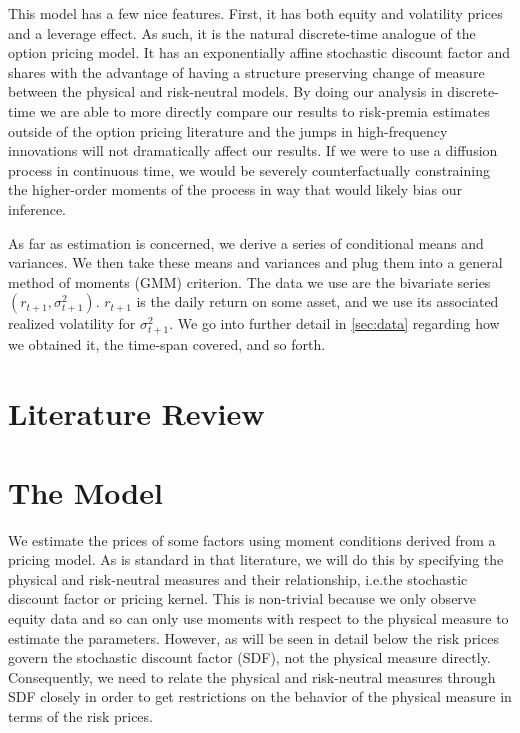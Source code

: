 \documentclass[11pt, letterpaper, twoside, final]{article}
\begin{document}
This model has a few nice features. 
First, it has both equity and volatility prices and a leverage effect. 
As such, it is the natural discrete-time analogue of the \textcite{heston1993closedform} option pricing model. 
It has an exponentially affine stochastic discount factor  and shares with \textcite{heston1993closedform} the
advantage of having a structure preserving change of measure between the physical and risk-neutral models.
By doing our analysis in discrete-time we are able to more directly compare our results to risk-premia estimates
outside of the option pricing literature and the jumps in high-frequency innovations will not dramatically affect
our results.  
If we were to use a diffusion process in continuous time, we would be severely counterfactually constraining the
higher-order  moments of the process in way that would likely bias our inference. 

As far as estimation is concerned, we derive a series of conditional means and variances.
We then take these means and variances and plug them into a general method of moments (GMM) criterion.
The data we use are the bivariate series $(r_{t+1}, \sigma^2_{t+1})$.
$r_{t+1}$ is the daily return on some asset, and we use its associated realized volatility for $\sigma^2_{t+1}$.
We go into further detail in \cref{sec:data} regarding how we obtained it, the time-span covered, and so forth.

\section{Literature Review}\label{sec:lit_review}


\section{The Model}\label{sec:model}

\addtocounter{subsection}{1}

We estimate the prices of some factors using moment conditions derived from a pricing model. 
As is standard in that literature, we will do  this by specifying the physical and risk-neutral measures and their
relationship, i.e.\@ the stochastic discount factor or pricing kernel.
This is non-trivial because we only observe equity data and so can only use moments with respect to the physical
measure to estimate the parameters. 
However, as will be seen in detail below the risk prices govern the stochastic discount factor (SDF), not the
physical measure directly. 
Consequently, we need to relate the physical and risk-neutral measures through SDF closely in order to get
restrictions on the behavior of the physical measure in terms of the risk prices. 
\end{document}
